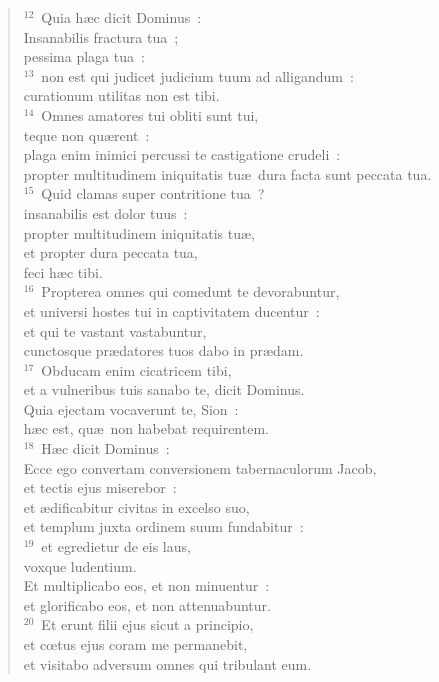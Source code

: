 \begin{verse}
${}^{12}$~Quia h\ae c dicit Dominus~:\\ Insanabilis fractura tua~;\\ pessima plaga tua~:\\
${}^{13}$~non est qui judicet judicium tuum ad alligandum~:\\ curationum utilitas non est tibi.\\
${}^{14}$~Omnes amatores tui obliti sunt tui,\\ teque non qu\ae rent~:\\ plaga enim inimici percussi te castigatione crudeli~:\\ propter multitudinem iniquitatis tu\ae\ dura facta sunt peccata tua.\\
${}^{15}$~Quid clamas super contritione tua~?\\ insanabilis est dolor tuus~:\\ propter multitudinem iniquitatis tu\ae ,\\ et propter dura peccata tua,\\ feci h\ae c tibi.\\
${}^{16}$~Propterea omnes qui comedunt te devorabuntur,\\ et universi hostes tui in captivitatem ducentur~:\\ et qui te vastant vastabuntur,\\ cunctosque pr\ae datores tuos dabo in pr\ae dam.\\
${}^{17}$~Obducam enim cicatricem tibi,\\ et a vulneribus tuis sanabo te, dicit Dominus.\\ Quia ejectam vocaverunt te, Sion~:\\ h\ae c est, qu\ae\ non habebat requirentem.\\
${}^{18}$~H\ae c dicit Dominus~:\\ Ecce ego convertam conversionem tabernaculorum Jacob,\\ et tectis ejus miserebor~:\\ et \ae dificabitur civitas in excelso suo,\\ et templum juxta ordinem suum fundabitur~:\\
${}^{19}$~et egredietur de eis laus,\\ voxque ludentium.\\ Et multiplicabo eos, et non minuentur~:\\ et glorificabo eos, et non attenuabuntur.\\
${}^{20}$~Et erunt filii ejus sicut a principio,\\ et cœtus ejus coram me permanebit,\\ et visitabo adversum omnes qui tribulant eum.\\

\end{verse}
